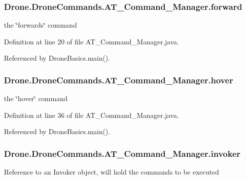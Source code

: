 \subsubsection[{forward}]{ Drone.\+Drone\+Commands.\+A\+T\+\_\+\+Command\+\_\+\+Manager.\+forward\hspace{0.3cm}{\ttfamily [private]}}\label{class_drone_1_1_drone_commands_1_1_a_t___command___manager_a73bf7a9109943dceafd6ca5c7d99d47c}
the \char`\"{}forwards\char`\"{} command 

Definition at line 20 of file A\+T\+\_\+\+Command\+\_\+\+Manager.\+java.



Referenced by Drone\+Basics.\+main().

\hypertarget{class_drone_1_1_drone_commands_1_1_a_t___command___manager_aafd47053f06ac149caa6e349f67906fb}{}
\subsubsection[{hover}]{ Drone.\+Drone\+Commands.\+A\+T\+\_\+\+Command\+\_\+\+Manager.\+hover\hspace{0.3cm}{\ttfamily [private]}}\label{class_drone_1_1_drone_commands_1_1_a_t___command___manager_aafd47053f06ac149caa6e349f67906fb}
the \char`\"{}hover\char`\"{} command 

Definition at line 36 of file A\+T\+\_\+\+Command\+\_\+\+Manager.\+java.



Referenced by Drone\+Basics.\+main().

\hypertarget{class_drone_1_1_drone_commands_1_1_a_t___command___manager_a642a1ab26cb9c2df925c2a62d9c15d44}{}
\subsubsection[{invoker}]{ Drone.\+Drone\+Commands.\+A\+T\+\_\+\+Command\+\_\+\+Manager.\+invoker\hspace{0.3cm}{\ttfamily [private]}}\label{class_drone_1_1_drone_commands_1_1_a_t___command___manager_a642a1ab26cb9c2df925c2a62d9c15d44}
Reference to an Invoker object, will hold the commands to be executed 

